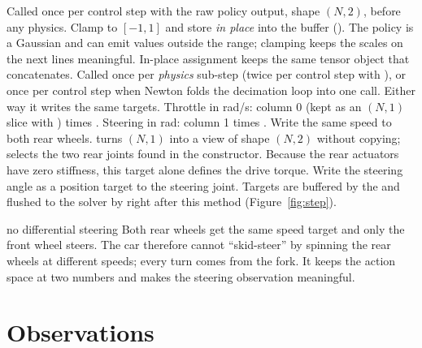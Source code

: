 \begin{explain}
 Called once per control step with the raw policy output, shape
  $(N, 2)$, before any physics.
 Clamp to $[-1,1]$ and store \emph{in place} into the buffer
  (\code{[:]}). The policy is a Gaussian and can emit values outside the
  range; clamping keeps the scales on the next lines meaningful. In-place
  assignment keeps the same tensor object that
   concatenates.
 Called once per \emph{physics} sub-step (twice per control step with
  ), or once per control step when Newton folds the
  decimation loop into one call. Either way it writes the same targets.
 Throttle in rad/s: column 0 (kept as an $(N,1)$ slice with
  ) times .
 Steering in rad: column 1 times .
 Write the same speed to both rear wheels.
   turns $(N,1)$ into a view of shape $(N,2)$ without
  copying;  selects the two rear joints found in the
  constructor. Because the rear actuators have zero stiffness, this target
  alone defines the drive torque.
 Write the steering angle as a position target to the steering
  joint. Targets are buffered by the  and flushed to the
  solver by  right after this method
  (Figure~\ref{fig:step}).
\end{explain}

\begin{whybox}{no differential steering}
Both rear wheels get the same speed target and only the front wheel steers.
The car therefore cannot ``skid-steer'' by spinning the rear wheels at
different speeds; every turn comes from the fork. It keeps the action space
at two numbers and makes the steering observation meaningful.
\end{whybox}

\section{Observations}



